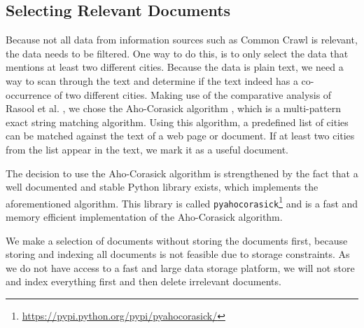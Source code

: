 \subsection{Selecting Relevant Documents}
Because not all data from information sources such as Common Crawl is relevant, the data needs to be filtered. One way to do this, is to only select the data that mentions at least two different cities. Because the data is plain text, we need a way to scan through the text and determine if the text indeed has a co-occurrence of two different cities.
Making use of the comparative analysis of Rasool et al. \cite{rasool2012string}, we chose the Aho-Corasick algorithm \cite{Aho-Corasick}, which is a multi-pattern exact string matching algorithm. Using this algorithm, a predefined list of cities can be matched against the text of a web page or document. If at least two cities from the list appear in the text, we mark it as a useful document.

The decision to use the Aho-Corasick algorithm is strengthened by the fact that a well documented and stable Python library exists, which implements the aforementioned algorithm. This library is called \texttt{pyahocorasick}\footnote{\url{https://pypi.python.org/pypi/pyahocorasick/}} and is a fast and memory efficient implementation of the Aho-Corasick algorithm.

We make a selection of documents without storing the documents first, because storing and indexing all documents is not feasible due to storage constraints. As we do not have access to a fast and large data storage platform, we will not store and index everything first and then delete irrelevant documents.
